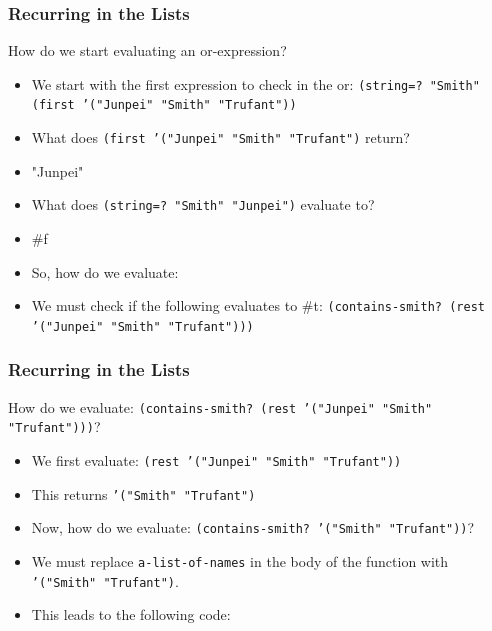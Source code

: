 \documentclass{beamer}
\begin{document}

\begin{frame}
  \frametitle{Recurring in the Lists}
  How do we start evaluating an or-expression?
  \begin{itemize}
  \item<2-> We start with the first expression to check in the or:
   \texttt{(string=? "Smith" (first '("Junpei" "Smith" "Trufant"))}
  \item<4-> What does \texttt{(first '("Junpei" "Smith" "Trufant")} return?
  \item<5-> "Junpei"
  \item<6-> What does \texttt{(string=? "Smith" "Junpei")} evaluate to?
  \item<7-> \#f
  \item<8-> So, how do we evaluate:
    \ContainsElseEvalOne 
  \item<9-> We must check if the following evaluates to \#t: \texttt{(contains-smith? (rest '("Junpei" "Smith" "Trufant")))}
  \end{itemize}
\end{frame}


\begin{frame}
  \frametitle{Recurring in the Lists}
  How do we evaluate:
  \texttt{(contains-smith? (rest '("Junpei" "Smith" "Trufant")))}?
  \begin{itemize}
  \item<2-> We first evaluate: \texttt{(rest '("Junpei" "Smith" "Trufant"))}
  \item<3-> This returns \texttt{'("Smith" "Trufant")}
  \item<4-> Now, how do we evaluate:
    \texttt{(contains-smith?  '("Smith" "Trufant"))}?
  \item<5-> We must replace \texttt{a-list-of-names} in the body of the function with \texttt{'("Smith" "Trufant")}.
  \item<6-> This leads to the following code:
    \CheckSmithSubTwo
  \end{itemize}
\end{frame}
\end{document}
